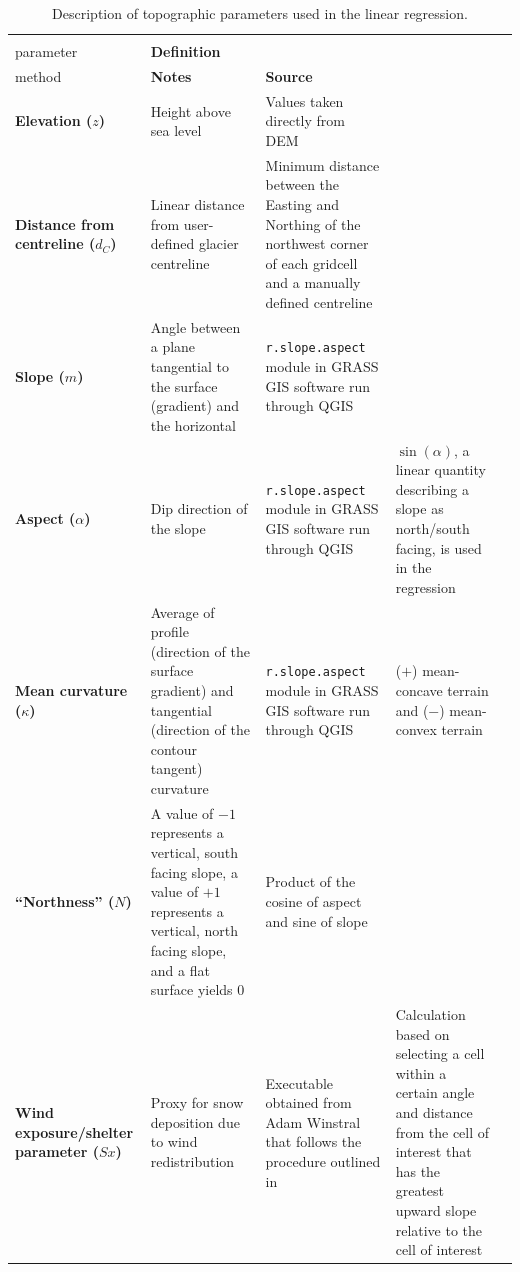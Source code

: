 \documentclass{sfuthesis}
\begin{document}
\begin{landscape}
\begin{table}
\footnotesize
\begin{threeparttable}
\caption{Description of topographic parameters used in the linear regression.}
\label{tab:TopoParams}
\begin{tabularx}{22cm}{XXXXX}
\midrule
\textbf{\begin{tabular}[c]{@{}l@{}}Topographic\\ parameter\end{tabular}} & \textbf{Definition} & \textbf{\begin{tabular}[c]{@{}l@{}}Calculation \\ method\end{tabular}} & \textbf{Notes} & \textbf{Source} \\ \midrule
\textbf{Elevation ($z$)} & Height above sea level & Values taken directly from DEM &  &  \\ \midrule
\textbf{Distance from centreline ($d_C$)} & Linear distance from user-defined glacier centreline & Minimum distance between the Easting and Northing of the northwest corner of each gridcell and a manually defined centreline &  &  \\ \midrule
\textbf{Slope ($m$)} & Angle between a plane tangential to the surface (gradient) and the horizontal & \texttt{r.slope.aspect} module in GRASS GIS software run through QGIS &  & \cite{Mitavsova1993, Hofierka2009, Olaya2009} \\ \midrule
\textbf{Aspect ($\alpha$)} & Dip direction of the slope & \texttt{r.slope.aspect} module in GRASS GIS software run through QGIS & $\sin(\alpha)$, a linear quantity describing a slope as north/south facing, is used in the regression & \cite{Mitavsova1993, Hofierka2009, Olaya2009} \\ \midrule
\textbf{Mean curvature ($\kappa$)} & Average of profile (direction of the surface gradient) and tangential (direction of the contour tangent) curvature & \texttt{r.slope.aspect} module in GRASS GIS software run through QGIS & ($+$) mean-concave terrain and ($-$) mean-convex terrain & \cite{Mitavsova1993, Hofierka2009, Olaya2009} \\ \midrule
\textbf{``Northness'' ($N$)} & A value of $-1$ represents a vertical, south facing slope, a value of $+1$ represents a vertical, north facing slope, and a flat surface yields 0 & Product of the cosine of aspect and sine of slope &  & \citep{Molotch2005} \\ \midrule
\textbf{Wind exposure/shelter parameter ($Sx$)} & Proxy for snow deposition due to wind redistribution & Executable obtained from Adam Winstral that follows the procedure outlined in \cite{Winstral2002} & Calculation based on selecting a cell within a certain angle and distance from the cell of interest that has the greatest upward slope relative to the cell of interest & \citep{Winstral2002}
\end{tabularx}
\end{threeparttable}
\end{table}
\end{landscape}
\end{document}
